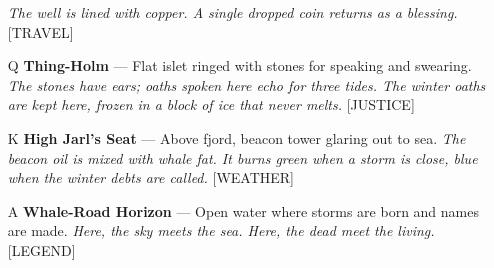 \begin{enumerate}
  \hfill \textit{The well is lined with copper. A single dropped coin returns as a blessing.} [TRAVEL]
\item[Q] \textbf{Thing-Holm} --- Flat islet ringed with stones for speaking and swearing.
  \hfill \textit{The stones have ears; oaths spoken here echo for three tides. The winter oaths are kept here, frozen in a block of ice that never melts.} [JUSTICE]
\item[K] \textbf{High Jarl's Seat} --- Above fjord, beacon tower glaring out to sea.
  \hfill \textit{The beacon oil is mixed with whale fat. It burns green when a storm is close, blue when the winter debts are called.} [WEATHER]
\item[A] \textbf{Whale-Road Horizon} --- Open water where storms are born and names are made.
  \hfill \textit{Here, the sky meets the sea. Here, the dead meet the living.} [LEGEND]
\end{enumerate}

